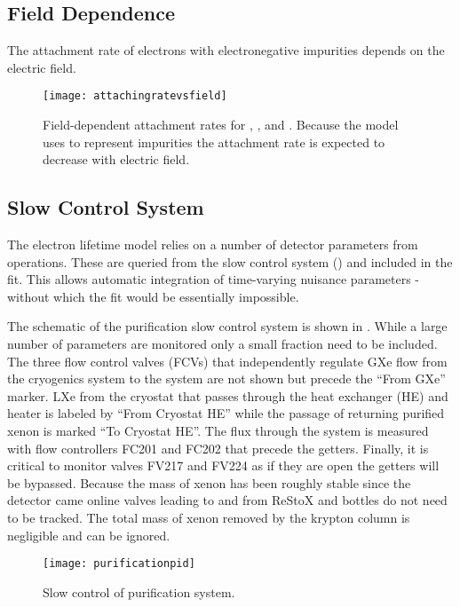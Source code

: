 \subsection{Field Dependence}
\label{subsec:electron_lifetime_model_field}
The attachment rate of electrons with electronegative impurities depends on the electric field.

\begin{figure}
\centering
\texttt{[image: attachingratevsfield]}
\caption{Field-dependent attachment rates for , , and .  Because the model uses  to represent
impurities the attachment rate is expected to decrease with electric field.}
\label{fig:electron_lifetime_model_field_attaching_rate}
\end{figure}



\subsection{Slow Control System}
\label{subsec:electron_lifetime_model_slow_control}
The electron lifetime model relies on a number of detector parameters from operations.  These are queried from the slow control system
() and included in the fit.  This allows automatic integration of time-varying nuisance
parameters - without which the fit would be essentially impossible.

The schematic of the purification slow control system is shown in .  While a large
number of parameters are monitored only a small fraction need to be included.  The three flow control valves (FCVs) that independently
regulate GXe flow from the cryogenics system to the system are not shown but precede the ``From GXe'' marker.  LXe from the cryostat that
passes
through the heat exchanger (HE) and heater is labeled by ``From Cryostat HE'' while the passage of returning purified xenon is marked
``To Cryostat HE''.  The flux through the system is
measured with flow controllers FC201 and FC202 that precede the getters.  Finally, it is critical to monitor valves FV217 and FV224 as
if they are open the getters will be bypassed.  Because the mass of xenon has been roughly stable since the detector came online valves
leading to and from ReStoX and bottles do not need to be tracked.  The total mass of xenon removed by the krypton column is negligible and
can be ignored.

\begin{figure}
\centering
\texttt{[image: purificationpid]}
\caption{Slow control of purification system.}
\label{fig:electron_lifetime_model_slow_control_pur}
\end{figure}

